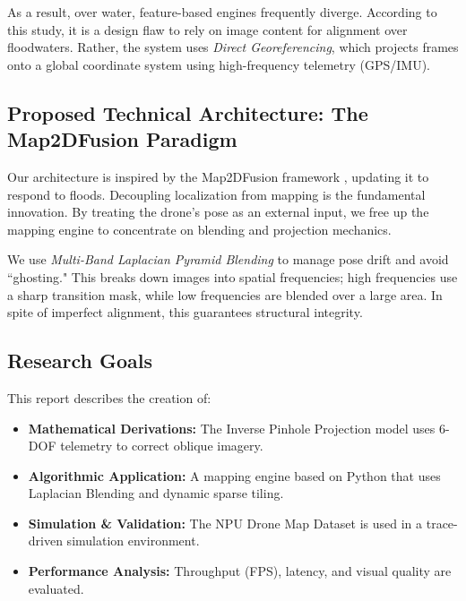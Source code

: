 \documentclass[conference]{IEEEtran}
\begin{document}
As a result, over water, feature-based engines frequently diverge. According to this study, it is a design flaw to rely on image content for alignment over floodwaters. Rather, the system uses \textit{Direct Georeferencing}, which projects frames onto a global coordinate system using high-frequency telemetry (GPS/IMU).

\subsection{Proposed Technical Architecture: The Map2DFusion Paradigm}
Our architecture is inspired by the Map2DFusion framework \cite{map2dfusion}, updating it to respond to floods. Decoupling localization from mapping is the fundamental innovation. By treating the drone's pose as an external input, we free up the mapping engine to concentrate on blending and projection mechanics.

We use \textit{Multi-Band Laplacian Pyramid Blending} to manage pose drift and avoid “ghosting." This breaks down images into spatial frequencies; high frequencies use a sharp transition mask, while low frequencies are blended over a large area. In spite of imperfect alignment, this guarantees structural integrity.

\subsection{Research Goals}
This report describes the creation of: \begin{itemize} \item \textbf{Mathematical Derivations:} The Inverse Pinhole Projection model uses 6-DOF telemetry to correct oblique imagery.
    \item \textbf{Algorithmic Application:} A mapping engine based on Python that uses Laplacian Blending and dynamic sparse tiling.
    \item \textbf{Simulation \& Validation:} The NPU Drone Map Dataset is used in a trace-driven simulation environment.
    \item \textbf{Performance Analysis:} Throughput (FPS), latency, and visual quality are evaluated. \end{itemize}

\end{document}
